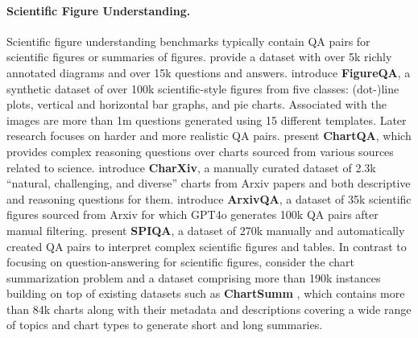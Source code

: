 
\paragraph{Scientific Figure Understanding.} 
Scientific figure understanding benchmarks typically contain QA pairs for scientific figures or summaries of figures.
\citet{10.1007/978-3-319-46493-0_15} provide a dataset with over 5k richly annotated diagrams and over 15k questions and answers. %
\citet{ebrahimi2018figureqa} introduce \textbf{FigureQA}, a synthetic dataset of over 100k scientific-style figures from five classes: (dot-)line plots, vertical and
horizontal bar graphs, and pie charts. Associated with the images are more than 1m questions %
generated using 15 different templates. 
Later research focuses on harder and more realistic QA pairs. %
\citet{masry-etal-2022-chartqa} present \textbf{ChartQA}, which provides complex reasoning questions over charts sourced from various sources related to science. %
\citet{wang2024charxiv} introduce \textbf{CharXiv}, %
a manually curated dataset of 2.3k ``natural, challenging, and diverse'' charts from %
Arxiv 
papers and %
both descriptive and reasoning questions for them. \citet{li-etal-2024-multimodal-arxiv} introduce \textbf{ArxivQA}, a dataset of 35k scientific figures sourced from Arxiv for which GPT4o generates 100k QA pairs after manual filtering. 
\citet{pramanick2024spiqa} present \textbf{SPIQA}, a dataset of 270k manually and automatically created QA pairs to interpret complex scientific figures and tables. 
In contrast to focusing on question-answering for scientific figures, \citet{xu2024chartadapterlargevisionlanguagemodel} consider the chart summarization problem and a dataset comprising more than 190k instances building on top of existing datasets such as \textbf{ChartSumm} \citep{Rahman2023ChartSummAC}, which contains more than 84k charts along with their metadata and descriptions covering a wide range of topics and chart types to generate short and long summaries. 

